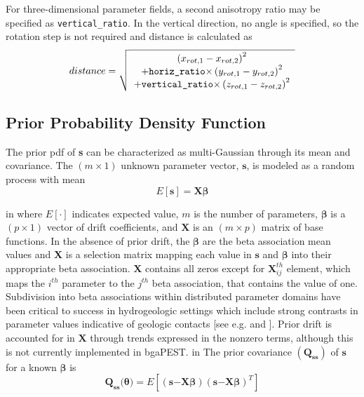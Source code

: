 \documentclass[11pt,oneside,onecolumn]{usgsreport}
\begin{document}
\begin{appendix}
\begin{bibunit}
For three-dimensional parameter fields, a second anisotropy ratio
may be specified as \texttt{vertical\_ratio}. In the vertical direction,
no angle is specified, so the rotation step is not required and distance
is calculated as
\[
distance=\sqrt{\begin{array}{c}
\left(x_{rot,1}-x_{rot,2}\right)^{2}\\
+\texttt{{horiz\_ratio}\ensuremath{\times}}\left(y_{rot,1}-y_{rot,2}\right)^{2}\\
+\texttt{{vertical\_ratio}\ensuremath{\times}}\left(z_{rot,1}-z_{rot,2}\right)^{2}
\end{array}}
\]



\subsection{\label{sub:Prior-Probability-Density}Prior Probability Density Function}

The prior pdf of \textbf{s} can be characterized as multi-Gaussian
through its mean and covariance. The $(m\times1)$ unknown parameter
vector, $\mathbf{s}$, is modeled as a random process with mean
\begin{equation}
E[\mathbf{s}]=\mathbf{X}\mathbf{\beta}\label{eq:Es}
\end{equation}

 in
where $E[\cdot]$ indicates expected value, $m$ is the number of
parameters, $\mathbf{\beta}$ is a $(p\times1)$ vector of drift coefficients,
and $\mathbf{X}$ is an $(m\times p)$ matrix of base functions. In
the absence of prior drift, the $\mathbf{\beta}$ are the beta association
mean values and $\mathbf{X}$ is a selection matrix mapping each value
in $\mathbf{s}$ and $\mathbf{\beta}$ into their appropriate beta
association. $\mathbf{X}$ contains all zeros except for \textbf{$\mathbf{X}_{ij}^{th}$}
element, which maps the $i^{th}$ parameter to the $j^{th}$ beta
association, that contains the value of one. Subdivision into beta
associations within distributed parameter domains have been critical
to success in hydrogeologic settings which include strong contrasts
in parameter values indicative of geologic contacts {[}see e.g. \citealp{fienenEtal2004}
and \citealp{FienenWRR2008}{]}. Prior drift is accounted for in $\mathbf{X}$
through trends expressed in the nonzero terms, although this is not
currently implemented in bgaPEST.
 in
The prior covariance $(\mathbf{Q_{ss}})$ of $\mathbf{s}$ for a known
$\mathbf{\beta}$ is
\[
\mathbf{Q_{ss}(}\mathbf{\theta})=E[(\mathbf{s}\mathbf{-}\mathbf{X\beta})(\mathbf{s}\mathbf{-}\mathbf{X\beta})^{T}]
\]


\end{bibunit}
\end{appendix}
\end{document}
